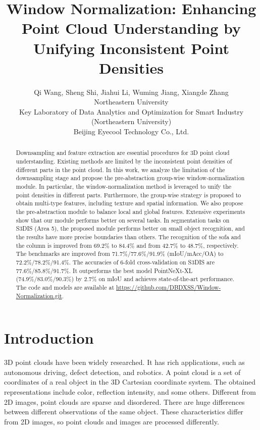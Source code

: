 \documentclass[10pt,twocolumn,letterpaper]{article}
\begin{document}
\title{Window Normalization: Enhancing Point Cloud Understanding by Unifying Inconsistent Point Densities}



\author{
    Qi Wang,
    Sheng Shi\footnotemark[1],
    Jiahui Li,
    Wuming Jiang,
    Xiangde Zhang\\
    Northeastern University \\
    Key Laboratory of Data Analytics and Optimization for Smart Industry (Northeastern University) \\
    Beijing Eyecool Technology Co., Ltd. \\
}
\maketitle

\begin{abstract}
  Downsampling and feature extraction are essential procedures for 3D point cloud understanding.
  Existing methods are limited by the inconsistent point densities of different parts in the point cloud.
  In this work, we analyze the limitation of the downsampling stage and propose the pre-abstraction group-wise window-normalization module.
  In particular, the window-normalization method is leveraged to unify the point densities in different parts.
  Furthermore, the group-wise strategy is proposed to obtain multi-type features, including texture and spatial information.
  We also propose the pre-abstraction module to balance local and global features.
  Extensive experiments show that our module performs better on several tasks.
  In segmentation tasks on S3DIS (Area 5), the proposed module performs better on small object recognition, and the results have more precise boundaries than others.
  The recognition of the sofa and the column is improved from 69.2\% to 84.4\% and from 42.7\% to 48.7\%, respectively.
  The benchmarks are improved from 71.7\%/77.6\%/91.9\% (mIoU/mAcc/OA) to 72.2\%/78.2\%/91.4\%.
  The accuracies of 6-fold cross-validation on S3DIS are 77.6\%/85.8\%/91.7\%.
  It outperforms the best model PointNeXt-XL (74.9\%/83.0\%/90.3\%) by 2.7\% on mIoU and achieves state-of-the-art performance.
  The code and models are available at  \url{https://github.com/DBDXSS/Window-Normalization.git}.
\end{abstract}




\section{Introduction}
    \label{sec:1}
    3D point clouds have been widely researched. It has rich applications, such as autonomous driving, defect detection, and robotics. A point cloud is a set of coordinates of a real object in the 3D Cartesian coordinate system. The obtained representations include color, reflection intensity, and some others. Different from 2D images, point clouds are sparse and disordered. There are huge differences between different observations of the same object. These characteristics differ from 2D images, so point clouds and images are processed differently.
\end{document}
